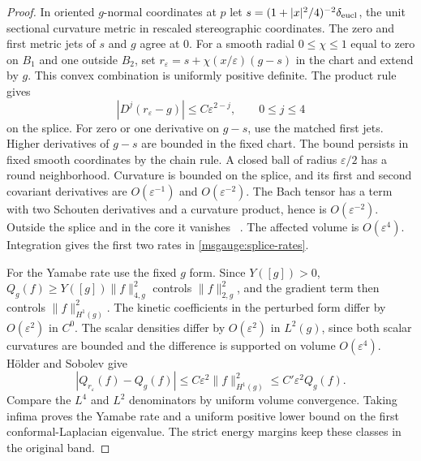 \documentclass[11pt]{article}
\numberwithin{equation}{section}
\theoremstyle{definition}
\theoremstyle{remark}
\begin{document}
\begin{proof}
In oriented \(g\)-normal coordinates at \(p\) let
\(s=(1+|x|^2/4)^{-2}\delta_{\rm eucl}\), the unit sectional curvature
metric in rescaled stereographic coordinates. The zero and first
metric jets of \(s\) and \(g\) agree at \(0\). For a smooth radial
\(0\le\chi\le1\) equal to zero on \(B_1\) and one outside \(B_2\),
set \(r_\varepsilon=s+\chi(x/\varepsilon)(g-s)\) in the chart
and extend by \(g\). This convex combination is uniformly positive
definite. The product rule gives
\begin{equation}\label{msgauge:splice-jets}
 |D^j(r_\varepsilon-g)|\le C\varepsilon^{2-j},\qquad
        0\le j\le4
\end{equation}
on the splice. For zero or one derivative on \(g-s\), use the
matched first jets. Higher derivatives of \(g-s\) are bounded in
the fixed chart. The bound persists in fixed smooth coordinates by
the chain rule. A closed ball of radius \(\varepsilon/2\) has
a round neighborhood. Curvature is bounded on the splice, and its
first and second covariant derivatives are \(O(\varepsilon^{-1})\)
and \(O(\varepsilon^{-2})\). The Bach tensor has a term with two
Schouten derivatives and a curvature product, hence is
\(O(\varepsilon^{-2})\). Outside the splice and in the core it
vanishes%
~\cite[\S1, (1.1)]{BahuaudGuentherIsenbergMazzeo2025Bach}.
The affected volume is \(O(\varepsilon^4)\). Integration gives the
first two rates in \eqref{msgauge:splice-rates}.

For the Yamabe rate use the fixed \(g\) form. Since \(Y([g])>0\),
\(Q_g(f)\ge Y([g])\|f\|_{4,g}^2\) controls \(\|f\|_{2,g}^2\),
and the gradient term then controls \(\|f\|_{H^1(g)}^2\).
The kinetic coefficients in the perturbed form differ by
\(O(\varepsilon^2)\) in \(C^0\). The scalar densities differ
by \(O(\varepsilon^2)\) in \(L^2(g)\), since both scalar curvatures
are bounded and the difference is supported on volume
\(O(\varepsilon^4)\). Hölder and Sobolev give
\[
 |Q_{r_\varepsilon}(f)-Q_g(f)|
       \le C\varepsilon^2\|f\|_{H^1(g)}^2
       \le C'\varepsilon^2 Q_g(f).
\]
Compare the \(L^4\) and \(L^2\) denominators by uniform volume
convergence. Taking infima proves the Yamabe rate and a uniform
positive lower bound on the first conformal-Laplacian eigenvalue.
The strict energy margins keep these classes in the original band.


\end{proof}
\end{document}
